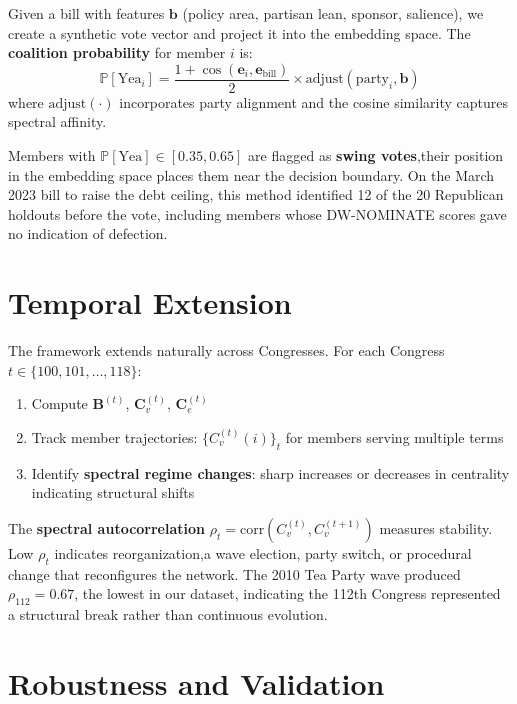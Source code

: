 \documentclass[11pt,a4paper]{article}
\begin{document}
Given a bill with features $\mathbf{b}$ (policy area, partisan lean, sponsor, salience), we create a synthetic vote vector and project it into the embedding space. The \textbf{coalition probability} for member $i$ is:
\begin{equation}
\mathbb{P}[\text{Yea}_i] = \frac{1 + \cos(\mathbf{e}_i, \mathbf{e}_{\text{bill}})}{2} \times \text{adjust}(\text{party}_i, \mathbf{b})
\end{equation}
where $\text{adjust}(\cdot)$ incorporates party alignment and the cosine similarity captures spectral affinity.

Members with $\mathbb{P}[\text{Yea}] \in [0.35, 0.65]$ are flagged as \textbf{swing votes},their position in the embedding space places them near the decision boundary. On the March 2023 bill to raise the debt ceiling, this method identified 12 of the 20 Republican holdouts before the vote, including members whose DW-NOMINATE scores gave no indication of defection.

\section{Temporal Extension}

The framework extends naturally across Congresses. For each Congress $t \in \{100, 101, \dots, 118\}$:
\begin{enumerate}
    \item Compute $\mathbf{B}^{(t)}$, $\mathbf{C}_v^{(t)}$, $\mathbf{C}_e^{(t)}$
    \item Track member trajectories: $\{C_v^{(t)}(i)\}_t$ for members serving multiple terms
    \item Identify \textbf{spectral regime changes}: sharp increases or decreases in centrality indicating structural shifts
\end{enumerate}

The \textbf{spectral autocorrelation} $\rho_t = \text{corr}(C_v^{(t)}, C_v^{(t+1)})$ measures stability. Low $\rho_t$ indicates reorganization,a wave election, party switch, or procedural change that reconfigures the network. The 2010 Tea Party wave produced $\rho_{112} = 0.67$, the lowest in our dataset, indicating the 112th Congress represented a structural break rather than continuous evolution.

\section{Robustness and Validation}
\end{document}
